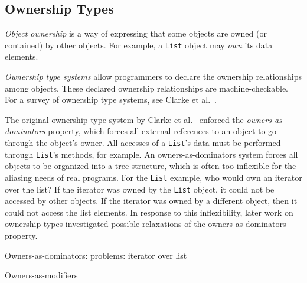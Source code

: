 \documentclass[letterpaper,11pt]{article}
\newcommand{\code}[1]{\lstinline$#1$}
\begin{document}
\subsection{Ownership Types}

\emph{Object ownership} is a way of expressing that some objects are owned (or contained)
by other objects. For example, a \code{List} object may \emph{own} its data elements.

\emph{Ownership type systems} allow programmers to declare the ownership relationships
among objects. These declared ownership relationships are machine-checkable.
For a survey of ownership type systems, see Clarke et al.~\cite{ownership-types}.

The original ownership type system by Clarke et al.~\cite{ownership-types-1998}
enforced the \emph{owners-as-dominators}
property, which forces all external references to an object to
go through the object's owner. All accesses of a \mbox{\code{List}'s} data
must be performed through \mbox{\code{List}'s} methods, for example.
An owners-as-dominators system forces all objects to be organized into a tree
structure, which is often too inflexible for the aliasing needs of real
programs. For the \code{List} example, who would own an iterator over the list?
If the iterator was owned by the \code{List} object, it could not be accessed by
other objects. If the iterator was owned by a different object,
then it could not access the list elements.
In response to this inflexibility,
later work on ownership types investigated possible relaxations of
the owners-as-dominators property.


Owners-as-dominators: problems: iterator over list

Owners-as-modifiers




%
%


\end{document}
